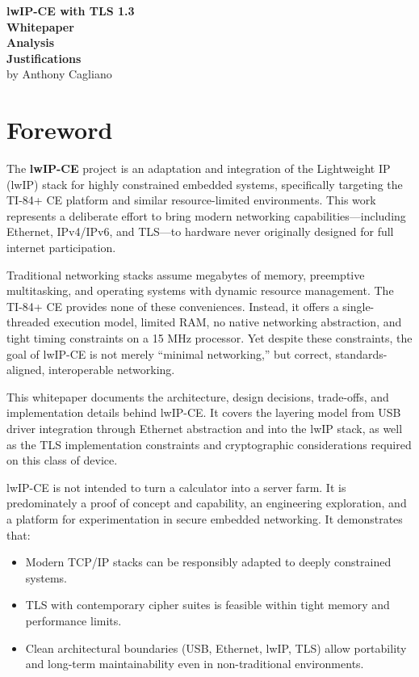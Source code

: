 \documentclass[titlepage]{report}
\begin{document}
	
	\begin{titlepage}
		\begin{center}
			\vspace*{1in}
			{\Large\textbf{lwIP-CE with TLS 1.3\\Whitepaper}}\\
			\vspace*{0.5in}
			{\huge\textbf{Analysis\\\vspace{10px}Justifications}}\\
			\vspace*{1in}
			by Anthony Cagliano
		\end{center}
	\end{titlepage}
	\setcounter{secnumdepth}{2}
	\setcounter{tocdepth}{2}
	\tableofcontents	
	
	\newpage
	\section{Foreword}
	The \textbf{lwIP-CE} project is an adaptation and integration of the Lightweight IP (lwIP) stack for highly constrained embedded systems, specifically targeting the TI-84+ CE platform and similar resource-limited environments. This work represents a deliberate effort to bring modern networking capabilities—including Ethernet, IPv4/IPv6, and TLS—to hardware never originally designed for full internet participation.
	
	Traditional networking stacks assume megabytes of memory, preemptive multitasking, and operating systems with dynamic resource management. The TI-84+ CE provides none of these conveniences. Instead, it offers a single-threaded execution model, limited RAM, no native networking abstraction, and tight timing constraints on a 15 MHz processor. Yet despite these constraints, the goal of lwIP-CE is not merely “minimal networking,” but correct, standards-aligned, interoperable networking.
	
	This whitepaper documents the architecture, design decisions, trade-offs, and implementation details behind lwIP-CE. It covers the layering model from USB driver integration through Ethernet abstraction and into the lwIP stack, as well as the TLS implementation constraints and cryptographic considerations required on this class of device.
	
	lwIP-CE is not intended to turn a calculator into a server farm. It is predominately a proof of concept and capability, an engineering exploration, and a platform for experimentation in secure embedded networking. It demonstrates that: 
	\begin{itemize}
	\item Modern TCP/IP stacks can be responsibly adapted to deeply constrained systems.
	\item TLS with contemporary cipher suites is feasible within tight memory and performance limits.
	\item Clean architectural boundaries (USB,  Ethernet, lwIP, TLS) allow portability and long-term maintainability even in non-traditional environments.
	\end{itemize}
	
\end{document}
